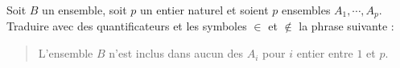 Soit $B$ un ensemble, soit $p$ un entier naturel et soient $p$ ensembles $A_1,\cdots,A_p$.\\
Traduire avec des quantificateurs et les symboles $\in$ et $\not\in$ la phrase suivante :
\begin{quotation}
 L'ensemble $B$ n'est inclus dans aucun des $A_i$ pour $i$ entier entre $1$ et $p$.
\end{quotation}
\bigskip \bigskip